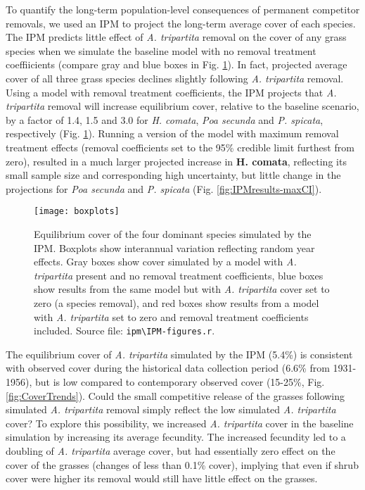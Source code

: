 \documentclass[11pt]{article}
\begin{document}
\begin{doublespacing}
To quantify the long-term population-level consequences of permanent competitor removals, we used an IPM to project the long-term average cover of each species. The IPM predicts little effect of \textit{A. tripartita} removal on the cover of any grass species when we simulate the baseline model with no removal treatment coeffiicients (compare gray and blue boxes in Fig. \ref{fig:IPMresults}). In fact, projected average cover of all three grass species declines slightly following \textit{A. tripartita} removal. 
Using a model with removal treatment coefficients, the IPM projects that \textit{A. tripartita} removal will increase equilibrium cover, relative to the baseline scenario, by a factor of 1.4, 1.5 and 3.0 for \textit{H. comata}, \textit{Poa secunda} and \textit{P. spicata}, respectively (Fig. \ref{fig:IPMresults}). 
Running a version of the model with maximum removal treatment effects (removal coefficients set to the 95\% credible limit furthest from zero), resulted in a much larger projected increase in \textbf{H. comata}, reflecting its small sample size and corresponding high uncertainty, but little change in the projections for \textit{Poa secunda} and \textit{P. spicata} (Fig. \ref{fig:IPMresults-maxCI}). 


 \begin{figure}[tbp]
 \centering
 \texttt{[image: boxplots]}
 \caption{Equilibrium cover of the four dominant species simulated by the IPM. Boxplots show interannual variation reflecting random year effects. Gray boxes show cover simulated by a model with \textit{A. tripartita} present and no removal treatment coefficients, blue boxes show results from the same model but with \textit{A. tripartita} cover set to zero (a species removal), and red boxes show results from a model with \textit{A. tripartita} set to zero and removal treatment coefficients included. Source file: \texttt{ipm\textbackslash IPM-figures.r}.}
 \label{fig:IPMresults}
 \end{figure}
 
The equilibrium cover of \textit{A. tripartita} simulated by the IPM (5.4\%) is consistent with observed cover during the historical data collection period (6.6\% from 1931-1956), but is low compared to contemporary observed cover (15-25\%, Fig. \ref{fig:CoverTrends}). Could the small competitive release of the grasses
following simulated \textit{A. tripartita} removal simply reflect the low simulated \textit{A. tripartita} cover? To explore this possibility, we increased \textit{A. tripartita} cover in the baseline simulation by increasing its average fecundity. The increased fecundity led to a doubling of \textit{A. tripartita} average cover, but had essentially zero effect on the cover of the grasses (changes of less than 0.1\% cover), implying that even if shrub cover were higher its removal would still have little effect on the grasses. 
 

\end{doublespacing}
\end{document}
